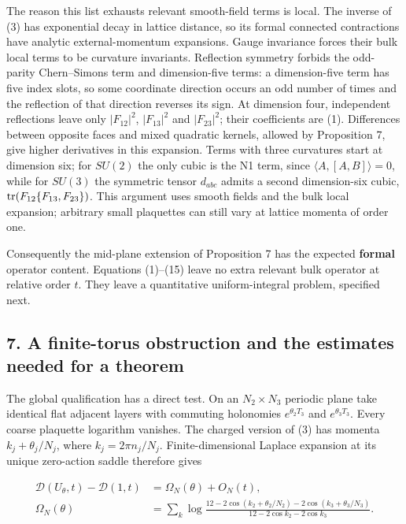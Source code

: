\documentclass[11pt,a4paper]{article}
\begin{document}
The reason this list exhausts relevant smooth-field terms is local. The
inverse of (3) has exponential decay in lattice distance, so its formal
connected contractions have analytic external-momentum expansions. Gauge
invariance forces their bulk local terms to be curvature invariants.
Reflection symmetry forbids the odd-parity Chern--Simons term and
dimension-five terms: a dimension-five term has five index slots, so
some coordinate direction occurs an odd number of times and the
reflection of that direction reverses its sign. At dimension four,
independent reflections leave only \(|F_{12}|^2\), \(|F_{13}|^2\) and
\(|F_{23}|^2\); their coefficients are (1). Differences between opposite
faces and mixed quadratic kernels, allowed by Proposition 7, give higher
derivatives in this expansion. Terms with three curvatures start at
dimension six; for \(SU(2)\) the only cubic is the N1 term, since
\(\langle A,[A,B]\rangle=0\), while for \(SU(3)\) the symmetric tensor
\(d_{abc}\) admits a second dimension-six cubic,
\({\rm tr}(F_{12}\{F_{13},F_{23}\})\). This argument uses smooth fields
and the bulk local expansion; arbitrary small plaquettes can still vary
at lattice momenta of order one.

Consequently the mid-plane extension of Proposition 7 has the expected
\textbf{formal} operator content. Equations (1)--(15) leave no extra
relevant bulk operator at relative order \(t\). They leave a
quantitative uniform-integral problem, specified next.

\hypertarget{a-finite-torus-obstruction-and-the-estimates-needed-for-a-theorem}{%
\subsection{7. A finite-torus obstruction and the estimates needed for a
theorem}\label{a-finite-torus-obstruction-and-the-estimates-needed-for-a-theorem}}

The global qualification has a direct test. On an \(N_2\times N_3\)
periodic plane take identical flat adjacent layers with commuting
holonomies \(e^{\theta_2T_3}\) and \(e^{\theta_3T_3}\). Every coarse
plaquette logarithm vanishes. The charged version of (3) has momenta
\(k_j+\theta_j/N_j\), where \(k_j=2\pi n_j/N_j\). Finite-dimensional
Laplace expansion at its unique zero-action saddle therefore gives

\[\begin{aligned}
\mathcal D(U_\theta,t)-\mathcal D(1,t)
 &=\Omega_N(\theta)+O_N(t),\\
\Omega_N(\theta)
 &=\sum_{k}\log\frac{12-2\cos(k_2+\theta_2/N_2)
                          -2\cos(k_3+\theta_3/N_3)}
                         {12-2\cos k_2-2\cos k_3}.
\end{aligned}\tag{16}\]
\end{document}
